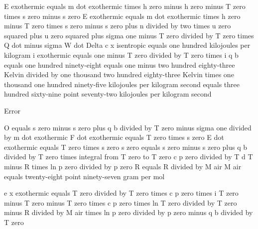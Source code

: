 E exothermic equals m dot exothermic times h zero minus h zero minus T zero times s zero minus s zero  
E exothermic equals m dot exothermic times h zero minus T zero times s zero minus s zero plus n divided by two times u zero squared plus u zero squared plus sigma one minus T zero divided by T zero times Q dot minus sigma W dot  
Delta c x isentropic equals one hundred kilojoules per kilogram  
i exothermic equals one minus T zero divided by T zero times i q b equals one hundred ninety-eight equals one minus two hundred eighty-three Kelvin divided by one thousand two hundred eighty-three Kelvin times one thousand one hundred ninety-five kilojoules per kilogram second equals three hundred sixty-nine point seventy-two kilojoules per kilogram second  

Error  

O equals s zero minus s zero plus q b divided by T zero minus sigma one divided by m dot exothermic  
F dot exothermic equals T zero times s zero  
E dot exothermic equals T zero times s zero  
s zero equals s zero minus s zero plus q b divided by T zero times integral from T zero to T zero c p zero divided by T d T minus R times ln p zero divided by p zero  
R equals R divided by M air  
M air equals twenty-eight point ninety-seven gram per mol  

e x exothermic equals T zero divided by T zero times c p zero times i T zero minus T zero minus T zero times c p zero times ln T zero divided by T zero minus R divided by M air times ln p zero divided by p zero minus q b divided by T zero